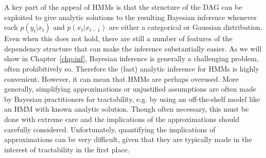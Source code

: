 A key part of the appeal of HMMs is that the structure of the
DAG can be exploited to give analytic solutions to the resulting Bayesian inference whenever each $p(y_t | x_t)$ 
and $p(x_t | x_{t-1})$ are either a categorical or Gaussian distribution. Even when this does not hold, there 
are still a number of features of the dependency structure that can make the inference substantially easier.
As we will show in Chapter~\ref{chp:inf}, Bayesian inference is generally a challenging problem, often prohibitively so.
Therefore the (fast) analytic inference for HMMs is highly convenient.  However, it can mean that HMMs are perhaps overused.
More generally, simplifying approximations or unjustified assumptions are often made by Bayesian practitioners 
for tractability, e.g. by using an off-the-shelf model like an HMM with known analytic solution. Though often necessary, 
this must be done with extreme care and the implications of the approximations should carefully considered.  Unfortunately, 
quantifying the implications of approximations can be very difficult, given that they are typically made in the interest
of tractability in the first place.  
